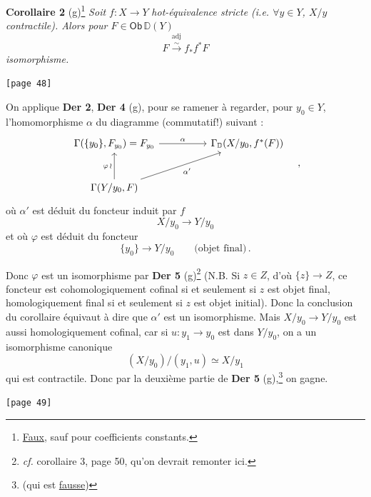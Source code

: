 \documentclass[11pt]{article}
\newcommand{\printedpage}[1]{\marginpar{\footnotesize p.~#1}}
\newcommand{\msp}[1]{\marginpar{\footnotesize [#1]}}
\newcommand{\Ob}{\mathsf{Ob}}
\newcommand{\D}{\mathbb{D}}
\begin{document}
\noindent\textbf{Corollaire 2} (g)\footnote[16]{\underline{Faux}, sauf pour coefficients constants.} \textit{Soit $f : X \to Y$} \textit{hot-équivalence stricte (i.e. $\forall y \in Y$, $X/y$ contractile). Alors pour $F \in \Ob\,\D(Y)$}
\[ F \overset{\text{adj}}{\xrightarrow{\sim}} f_{*} f^{*} F \]
 \textit{isomorphisme.} 

\noindent\msp{page 48}\texttt{[page 48]}

\noindent On applique \textbf{Der 2}, \textbf{Der 4} (g), pour se ramener à regarder, pour $y_{0} \in Y$, l'homomorphisme $\alpha$ du diagramme (commutatif!) suivant :
\[
\begin{tikzcd}[row sep=large, column sep=huge]
\Gamma(\{y_{0}\}, F_{y_{0}}) = F_{y_{0}} \arrow[r, "\alpha"] & \Gamma_{\D}(X/y_{0}, f^{*}(F)) \\
\Gamma(Y/y_{0}, F) \arrow[u, "\varphi\,\wr"] \arrow[ur, "\alpha'"'] &
\end{tikzcd}
\quad ,
\]
où $\alpha'$ est déduit du foncteur induit par $f$
\[ X/y_{0} \longrightarrow Y/y_{0} \]
et où $\varphi$ est déduit du foncteur
\[ \{y_{0}\} \longrightarrow Y/y_{0} \qquad \text{(objet final)}\,. \]


\printedpage{27}

\noindent Donc $\varphi$ est un isomorphisme par \textbf{Der 5} (g)\footnote[17]{\textit{cf.} corollaire 3, page 50, qu'on devrait remonter ici.} (N.B. Si $z \in Z$, d'où $\{z\} \to Z$, ce foncteur est cohomologiquement cofinal si et seulement si $z$ est objet final, homologiquement final si et seulement si $z$ est objet initial). Donc la conclusion du corollaire équivaut à dire que $\alpha'$ est un isomorphisme. Mais $X/y_{0} \to Y/y_{0}$ est aussi homologiquement cofinal, car si $u : y_{1} \to y_{0}$ est dans $Y/y_{0}$, on a un isomorphisme canonique
\[ (X/y_{0})/(y_{1}, u) \simeq X/y_{1} \]
qui est contractile. Donc par la deuxième partie de \textbf{Der 5} (g),\footnote[18]{(qui est \underline{fausse})} on gagne.

\noindent\msp{page 49}\texttt{[page 49]}
\end{document}

